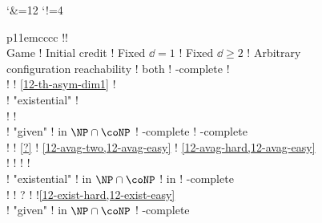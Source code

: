     \begin{landscape}%
      \centering
  \bigskip

  \begingroup
  \catcode`\&=12
  \catcode`!=4
  \ifstandalone
  \setlength{\tabcolsep}{3pt}
  \begin{tabular}{p{11em}cccc}
  \toprule 
  !!\\
  \cmidrule(l){3-5}
  Game ! Initial credit ! Fixed $\dd=1$ ! Fixed $\dd\geq 2$ ! Arbitrary\\
  \midrule
    configuration reachability%
    ! both
    ! \EXPSPACE-complete            
    !
  \\[-.5em]
    ! %
    ! {\tiny\cref{12-th-asym-dim1}} 
    !%
  \\
  \addlinespace
    ! "existential"
    ! 
  \\[-.5em]
    ! %
    ! 
  \\
    ! "given"      
    ! in $\NP\cap\coNP$             
    ! \EXP-complete
    ! \kEXP[2]-complete
  \\[-.5em]
    ! %
    ! {\tiny\cref{?}}                
    ! {\tiny\cref{12-avag-two,12-avag-easy}}
    ! {\tiny\cref{12-avag-hard,12-avag-easy}}
  \\[-.7em]
    ! %
    !
    !{\tiny\cite{Fahrenberg&Juhl&Larsen&Srba:2011,Courtois&Schmitz:2014}}
    !{\tiny\cite{Courtois&Schmitz:2014}}
  \\
  \addlinespace
    ! "existential"
    ! in $\NP\cap\coNP$             
    ! in \coNP
    ! \coNP-complete
  \\[-.5em]
    ! %
    ! {\tiny\cite{Chatterjee&Doyen:2012}?}
    !
    !{\tiny\cref{12-exist-hard,12-exist-easy}~\cite{Chatterjee&Doyen&Henzinger&Raskin:2010}}
  \\
    ! "given"
    ! in $\NP\cap\coNP$
    ! \EXP-complete

\end{tabular}
\end{landscape}
